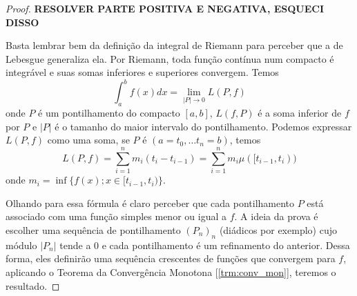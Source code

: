 \begin{problem}
    \label{prob:l3:2}
\end{problem}
\begin{proof}
    \textbf{RESOLVER PARTE POSITIVA E NEGATIVA, ESQUECI DISSO}

    Basta lembrar bem da definição da integral de Riemann para perceber que a de Lebesgue generaliza ela.
    Por Riemann, toda função contínua num compacto é integrável e suas somas inferiores e superiores convergem. Temos
    $$\int_a^b f(x) dx = \lim_{|P|\to 0} L(P,f)$$
    onde $P$ é um pontilhamento do compacto $[a,b]$, $L(f,P)$ é a soma inferior de $f$ por $P$ e $|P|$ é 
    o tamanho do maior intervalo do pontilhamento. Podemos expressar
    $L(P,f)$ como uma soma, se $P$ é $(a = t_0, \dots t_n = b)$, temos 
    $$L(P,f) = \sum_{i = 1}^{n} m_i (t_i - t_{i-1}) = \sum_{i = 1}^{n} m_i \mu([t_{i-1},t_i))$$
    onde $m_i = \inf\{f(x); x \in [t_{i-1}, t_{i})\}$.

    Olhando para essa fórmula é claro perceber que cada pontilhamento $P$ está associado com uma 
    função simples menor ou igual a $f$. A ideia da prova é escolher uma sequência de pontilhamento $(P_n)_n$ (diádicos por exemplo)
    cujo módulo $|P_n|$  tende a 0 e cada pontilhamento é um 
    refinamento do anterior. Dessa forma, eles definirão uma sequência crescentes de funções que convergem para $f$, 
    aplicando o Teorema da Convergência Monotona [\ref{trm:conv_mon}], teremos o resultado.


\end{proof}

